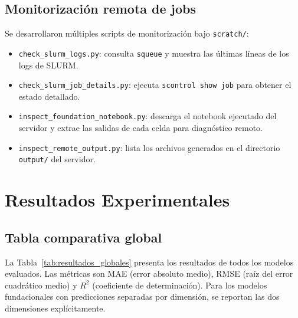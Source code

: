 \documentclass[12pt, a4paper]{article}
\newcommand{\code}[1]{\texttt{#1}}
\begin{document}
\subsection{Monitorización remota de jobs}

Se desarrollaron múltiples scripts de monitorización bajo \code{scratch/}:
\begin{itemize}
    \item \code{check\_slurm\_logs.py}: consulta \code{squeue} y muestra las últimas líneas de los logs de SLURM.
    \item \code{check\_slurm\_job\_details.py}: ejecuta \code{scontrol show job} para obtener el estado detallado.
    \item \code{inspect\_foundation\_notebook.py}: descarga el notebook ejecutado del servidor y extrae las salidas de cada celda para diagnóstico remoto.
    \item \code{inspect\_remote\_output.py}: lista los archivos generados en el directorio \code{output/} del servidor.
\end{itemize}


\section{Resultados Experimentales}
\label{sec:resultados}

\subsection{Tabla comparativa global}

La Tabla~\ref{tab:resultados_globales} presenta los resultados de todos los modelos evaluados. Las métricas son MAE (error absoluto medio), RMSE (raíz del error cuadrático medio) y $R^2$ (coeficiente de determinación). Para los modelos fundacionales con predicciones separadas por dimensión, se reportan las dos dimensiones explícitamente.
\end{document}
